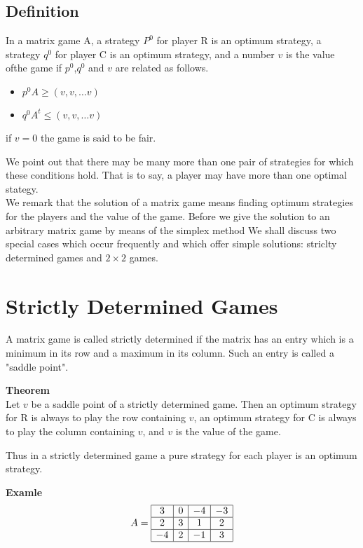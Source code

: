 \documentclass[]{report}
\begin{document}
\subsection{Definition}
In a matrix game A, a strategy $P^0$ for player R is an optimum strategy, a strategy $q^0$ for player C is an optimum strategy, and
a number $v$ is the value ofthe game if $p^0$,$q^0$ and $v$ are related as follows.
\begin{itemize}
\item $p^0A \geq (v,v,\ldots v)$
\item $q^0A^t \leq (v,v,\ldots v)$
\end{itemize}
if $v = 0$ the game is said to be fair.

We point out that there may be many more than one pair of strategies for which these conditions hold. That is to say, a player may have more than one optimal stategy.\\
\smallskip
We remark that the solution of a matrix game means finding optimum strategies for the players and the value of the game.
Before we give the solution to an arbitrary matrix game by means of the simplex method
We shall discuss two special cases which occur frequently and which offer simple solutions: striclty determined games and $2 \times 2$ games.

\section{Strictly Determined Games}

A matrix game is called strictly determined if the matrix has an entry which is a minimum in its row and a maximum in its column.
Such an entry is called a "saddle point".

\noindent \textbf{{Theorem}}\\ Let $v$ be a saddle point of a strictly determined game. Then an optimum strategy for R is always to play the row 
containing $v$, an optimum strategy for C is always to play the column containing $v$, and $v$ is the value of the game.\\ \smallskip

Thus in a strictly determined game a pure strategy for each player is an optimum strategy.

\noindent \textbf{{Examle}}\\ 
\[
A = 
\begin{array}{|c|c|c|c|} \hline
3 & 0 & -4 & -3 \\ \hline 
2 & 3 & 1 & 2 \\ \hline
-4 & 2 & -1 & 3 \\ \hline
\end{array}
\]
\end{document}
